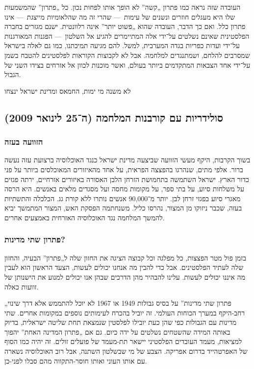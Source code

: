 העובדה שזה נראה כמו פתרון „קשה” לא הופך אותו לפחות נכון. כל „פתרון” שהמשמעות שלו היא מעגלים חוזרים ונשנים של עימות~— שהרי זה מה שהלאומיות מייצגת~— אינו פתרון כלל. ואם כך הדבר, העובדה שהוא „פשוט יותר” אינה רלוונטית. ישנם מגזרים בחברה הפלסטינית שאינם נשלטים על־ידי אלה המתיימרים להגיע אל השלטון~— הפגנות המאורגנות על־ידי ועדות כפריות בגדה המערבית, למשל. להם מגיעה תמיכתנו, כמו גם לאלה בישראל שמסרבים להלחם, ושמתנגדים למלחמה. אבל לא לקבוצות הקוראות לפלסטינים להטבח בשמן על־ידי אחד הצבאות המתקדמים ביותר בעולם, ואשר מוכנות לכוון אל אזרחים בצידו השני של הגבול.

לא משנה מי ימות, החמאס ומדינת ישראל ינצחו

\subsection*{סולידריות עם קורבנות המלחמה (ה־25 לינואר 2009)}

\subsubsection*{הזוועה בעזה}

בשוך הקרבות, היקף מעשי הזוועה שביצעה מדינת ישראל כנגד האוכלוסיה ברצועת עזה נעשה ברור. אלפי מתים, שנהרגו בהפצצה הפראית, על אחד מהאיזורים המאוכלסים ביותר על פני כדור הארץ. ישראל השתמשה בתחמושת הזרחן הלבן האסורה באיזורים אזרחיים, ירתה פגזים על משלחות סיוע, על בתי ספר, על מקומות מחסה ועל מסגדים מלאים באנשים. היא הרסה מאגרי סיוע בפגזי זרחן לבן. יותר מ־90,000 אנשים נותרו ללא קורת גג. הכלכלה והתשתיות בעזה, שכבר ניזוקו מן המצור, נהרסו כליל. משנחתמה הפסקת האש, המצור המתמשך יביא להמשך המלחמה נגד האוכלוסיה האזרחית באמצעים אחרים.

\subsubsection*{פתרון שתי מדינות?}

בזמן פול מטר הפצצות, כל מפלגה וכל קבוצה הציגה את החזון שלה ל„פתרון” הבעיה, והחזון שלה לעתיד הפלסטינים. אבל כדי להבין מה אנחנו יכולים לעשות, הצעד הראשון הוא לעבין מה איננו יכולים לעשות. עלינו להבהיר מהן הדרכים שבהן אנו יכולים למנוע את הישנותן של זוועות כאלה.

„פתרון שתי מדינות” על בסיס גבולות 1949 או 1967 לא יוכל להתממש אלא דרך שינוי רחב-היקף במערך הכוחות העולמי. זה יוביל בהכרח לעימותים נוספים במקומות אחרים. שתי מדינות עם הגבולות כפי שהן כעת יובילו לפלסטין שנמצאת תחת שליטה ישראלית, בדיוק באותה המידה שהשטחים נשלטים על ידה כיום. גם אם „פתרון המדינה האחת” יהפוך למציאות, מעמד העובדים הפלסטיני יישאר תת-מעמד של פועלים זולים. זה יהיה כמו הסוף של האפרטהייד בדרום אפריקה. הצבע של מי שבשלטון השתנה, אבל רוב האוכלוסיה נשארה עם אותו העוני ואותו חוסר-התקווה מהם סבלו לפני-כן.

